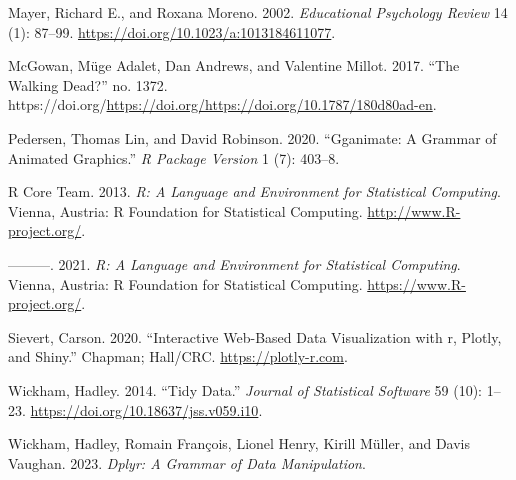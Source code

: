 \begin{CSLReferences}{1}{0}
\leavevmode{}%
Mayer, Richard E., and Roxana Moreno. 2002. \emph{Educational Psychology Review} 14 (1): 87--99. \url{https://doi.org/10.1023/a:1013184611077}.

\leavevmode{}%
McGowan, Müge Adalet, Dan Andrews, and Valentine Millot. 2017. {``The Walking Dead?''} no. 1372. https://doi.org/\url{https://doi.org/https://doi.org/10.1787/180d80ad-en}.

\leavevmode{}%
Pedersen, Thomas Lin, and David Robinson. 2020. {``Gganimate: A Grammar of Animated Graphics.''} \emph{R Package Version} 1 (7): 403--8.

\leavevmode{}%
R Core Team. 2013. \emph{R: A Language and Environment for Statistical Computing}. Vienna, Austria: R Foundation for Statistical Computing. \url{http://www.R-project.org/}.

\leavevmode{}%
---------. 2021. \emph{R: A Language and Environment for Statistical Computing}. Vienna, Austria: R Foundation for Statistical Computing. \url{https://www.R-project.org/}.

\leavevmode{}%
Sievert, Carson. 2020. {``Interactive {Web-Based} Data Visualization with r, Plotly, and Shiny.''} Chapman; Hall/CRC. \url{https://plotly-r.com}.

\leavevmode{}%
Wickham, Hadley. 2014. {``Tidy Data.''} \emph{Journal of Statistical Software} 59 (10): 1--23. \url{https://doi.org/10.18637/jss.v059.i10}.

\leavevmode{}%
Wickham, Hadley, Romain François, Lionel Henry, Kirill Müller, and Davis Vaughan. 2023. \emph{Dplyr: A Grammar of Data Manipulation}.

\end{CSLReferences}



\address{%
Krisanat Anukarnsakulchularp\\
Monash University\\%
Faculty of Business and Economics\\ Melbourne, Australia\\
%
%
\textit{ORCiD: \href{https://orcid.org/0009-0008-5638-7124}{0009-0008-5638-7124}}\\%
\href{mailto:kanu0003@student.monash.edu}{\nolinkurl{kanu0003@student.monash.edu}}%
}

